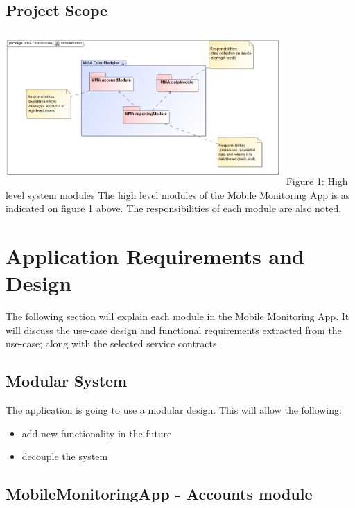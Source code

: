 \documentclass[hidelinks, 12pt, oneside]{article}
\begin{document}
	\subsection{Project Scope}
		{\centering
		
		\includegraphics[width=400px,height=220px]{img/highLevelSystem.jpg}
		\newline
		Figure 1: High level system modules
		\newline\newline
		The high level modules of the Mobile Monitoring App is as indicated on figure 1 above. The responsibilities of each module are also noted.
		}
	
	\section{Application Requirements and Design}
	The following section will explain each module in the Mobile Monitoring App. It will discuss the use-case design and  functional requirements extracted from the use-case; along with the selected service contracts.\newline
	
	\subsection{Modular System}
	 The application is going to use a modular design. This will allow the following:
	 \begin{itemize}
	\item add new functionality in the future
 	\item decouple the system
	\end{itemize}


	
	\subsection{MobileMonitoringApp - Accounts module}
\end{document}
